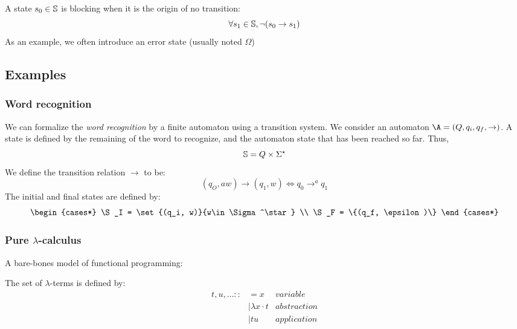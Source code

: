 \documentclass[toc, titlepaged]{../cs-classes/cs-classes}
\begin{document}
\begin{definition}
    A state $s_0\in\S$ is blocking when it is the origin of no transition:
    \begin{equation*}
        \forall s_1\in\S, \lnot(s_0\to s_1)
    \end{equation*}
    As an example, we often introduce an error state (usually noted $\Omega$)
\end{definition}

\subsection{Examples}
\subsubsection{Word recognition}
We can formalize the \emph{word recognition} by a finite automaton using a transition system. We consider an automaton $\A=(Q, q_i, q_f, \to)$. A state is defined by the remaining of the word to recognize, and the automaton state that has been reached so far. Thus,
\begin{equation*}
    \S = Q\times \Sigma^\star
\end{equation*}
We define the transition relation $\to$ to be:
\begin{equation*}
    (q_O, aw)\to(q_1, w) \iff q_0 \to^a q_1
\end{equation*}
The initial and final states are defined by:
\begin{equation*}
    \begin{cases*}
        \S_I = \set{(q_i, w)}{w\in\Sigma^\star} \\
        \S_F = \{(q_f, \epsilon)\}
    \end{cases*}
\end{equation*}

\subsubsection{Pure \texorpdfstring{$\lambda$}{ Ⲗ}-calculus}
A bare-bones model of functional programming:
\begin{definition}
    The set of $\lambda$-terms is defined by:
        \begin{align*}
            t, u, \dots ::&= x & variable\\
            &| \lambda x\cdot t & abstraction\\
            &| tu & application
        \end{align*}
\end{definition}
\end{document}
